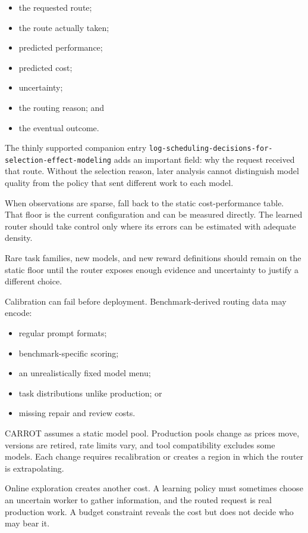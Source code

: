 \begin{itemize}
\tightlist
\item
  the requested route;
\item
  the route actually taken;
\item
  predicted performance;
\item
  predicted cost;
\item
  uncertainty;
\item
  the routing reason; and
\item
  the eventual outcome.
\end{itemize}

The thinly supported companion entry \texttt{log-scheduling-decisions-for-selection-effect-modeling} adds an important field: why the request received that route. Without the selection reason, later analysis cannot distinguish model quality from the policy that sent different work to each model.

When observations are sparse, fall back to the static cost-performance table. That floor is the current configuration and can be measured directly. The learned router should take control only where its errors can be estimated with adequate density.

Rare task families, new models, and new reward definitions should remain on the static floor until the router exposes enough evidence and uncertainty to justify a different choice.

Calibration can fail before deployment. Benchmark-derived routing data may encode:

\begin{itemize}
\tightlist
\item
  regular prompt formats;
\item
  benchmark-specific scoring;
\item
  an unrealistically fixed model menu;
\item
  task distributions unlike production; or
\item
  missing repair and review costs.
\end{itemize}

CARROT assumes a static model pool. Production pools change as prices move, versions are retired, rate limits vary, and tool compatibility excludes some models. Each change requires recalibration or creates a region in which the router is extrapolating.

Online exploration creates another cost. A learning policy must sometimes choose an uncertain worker to gather information, and the routed request is real production work. A budget constraint reveals the cost but does not decide who may bear it.

